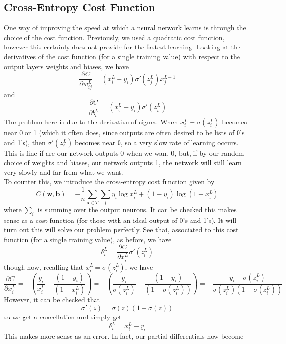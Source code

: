 \documentclass[10pt]{article}
\begin{document}
\subsection{Cross-Entropy Cost Function}
One way of improving the speed at which a neural network learns is through the choice of the cost function. Previously, we used a quadratic cost function, however this certainly does not provide for the fastest learning. Looking at the derivatives of the cost function (for a single training value) with respect to the output layers weights and biases, we have
\[
\frac{\partial C}{\partial w^{L}_{ij}} = \left(x^{L}_i - y_{i}\right) \sigma'\left(z^{L}_j\right)x^{L-1}_j
\]
and
\[
\frac{\partial C}{\partial b^{L}_{i}} = \left(x^{L}_i - y_{i}\right) \sigma'\left(z^{L}_i\right)
\]
The problem here is due to the derivative of sigma. When $x^L_i=\sigma\left(z^{L}_i\right)$ becomes near 0 or 1 (which it often does, since outputs are often desired to be lists of 0's and 1's), then $\sigma'\left(z^{L}_i\right)$ becomes near 0, so a very slow rate of learning occurs. This is fine if are our network outputs 0 when we want 0, but, if by our random choice of weights and biases, our network outputs 1, the network will still learn very slowly and far from what we want. \\
To counter this, we introduce the cross-entropy cost function given by
\[
C(\mathbf{w},\mathbf{b})= -\frac{1}{n} \sum_{\mathbf{x} \in T} \sum_{i} y_i \log x^{L}_i +(1-y_i)\log\left(1-x^{L}_i\right)
\]
where $\sum_{i}$ is summing over the output neurons. It can be checked this makes sense as a cost function (for those with an ideal output of 0's and 1's). It will turn out this will solve our problem perfectly. See that, associated to this cost function (for a single training value), as before, we have
\[
\delta^{L}_i = \frac{\partial C}{\partial x^{L}_i} \sigma'\left(z^{L}_i\right)
\]
though now, recalling that $x^{L}_i = \sigma\left( z^{L}_i \right)$, we have
\[
\frac{\partial C}{\partial x^{L}_i} = -\left(  \frac{y_i}{x^{L}_i}  - \frac{(1-y_i)}{(1-x^{L}_i)} \right) = - \left(  \frac{y_i}{\sigma\left( z^{L}_i \right)}  - \frac{(1-y_i)}{\left(1-\sigma\left( z^{L}_i \right)\right)} \right)
= -\frac{y_i - \sigma\left( z^{L}_i \right)}{\sigma\left( z^{L}_i \right)\left(1-\sigma\left( z^{L}_i \right)\right)}
\]
However, it can be checked that
\[
\sigma'\left(z\right) = \sigma\left(z\right)\left(1-\sigma\left(z\right)\right)
\]
so we get a cancellation and simply get
\[
\delta^{L}_i = x^{L}_i - y_i
\]
This makes more sense as an error. In fact, our partial differentials now become
\end{document}
